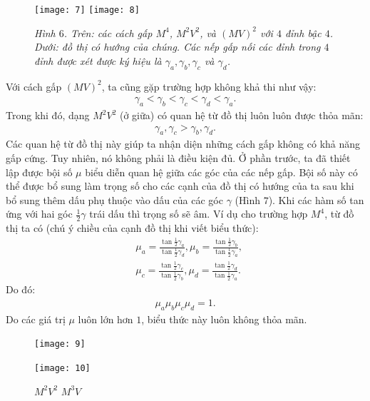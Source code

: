 \begin{multicols}{2}
\begin{figure}[H]
		\vspace*{-5pt}
		\centering
		\captionsetup{labelformat= empty, justification=centering}
		\texttt{[image: 7]}
		\texttt{[image: 8]}
		\caption{\small\textit{\color{duongvaotoanhoc}Hình $6$. Trên: các cách gấp $M^4$, $M^2 V^2$, và $(MV)^2$ với $4$ đỉnh bậc $4$. Dưới: đồ thị có hướng của chúng. Các nếp gấp nối các đỉnh trong $4$ đỉnh được xét được ký hiệu là $\gamma_a, \gamma_b, \gamma_c$ và $\gamma_d$.}}
		\vspace*{-5pt}
	\end{figure}
	Với cách gấp $(MV)^2$, ta cũng gặp trường hợp không khả thi như vậy:
	\begin{align*}
		\gamma_a<\gamma_b<\gamma_c<\gamma_d<\gamma_a.
	\end{align*}
	Trong khi đó, dạng $M^2 V^2$ (ở giữa) có quan hệ từ đồ thị luôn luôn được thỏa mãn:
	\begin{align*}
		\gamma_a,\gamma_c>\gamma_b,\gamma_d.
	\end{align*} 
	Các quan hệ từ đồ thị này giúp ta nhận diện những cách gấp không có khả năng gấp cứng. Tuy nhiên, nó không phải là điều kiện đủ. Ở phần trước, ta đã thiết lập được bội số $\mu$ biểu diễn quan hệ giữa các góc của các nếp gấp. Bội số này có thể được bổ sung làm trọng số cho các cạnh của đồ thị có hướng của ta sau khi bổ sung thêm dấu phụ thuộc vào dấu của các góc $\gamma$ (Hình $7$). Khi các hàm số tan ứng với hai góc $\frac{1}{2}\gamma$ trái dấu thì trọng số sẽ âm.
	\vskip 0.05cm
	Ví dụ cho trường hợp $M^4$, từ đồ thị ta có (chú ý chiều của cạnh đồ thị khi viết biểu thức):
	\begin{align*}
		&\mu_a = \frac{\tan\frac{1}{2}\gamma_a}{\tan\frac{1}{2}\gamma_d},\mu_b = \frac{\tan\frac{1}{2}\gamma_b}{\tan\frac{1}{2}\gamma_a},\\
		& \mu_c= \frac{\tan\frac{1}{2}\gamma_c}{\tan\frac{1}{2}\gamma_b}, \mu_d = \frac{\tan\frac{1}{2}\gamma_d}{\tan\frac{1}{2}\gamma_a}.
	\end{align*}
	Do đó:
	\begin{align*}
		\mu_a\mu_b\mu_c\mu_d = 1.
	\end{align*}
	Do các giá trị $\mu$ luôn lớn hơn $1$, biểu thức này luôn không thỏa mãn.
	\begin{figure}[H]
		\vspace*{-5pt}
		\centering
		\captionsetup{labelformat= empty, justification=centering}
		\texttt{[image: 9]}
		\caption{\quad$M^4$				\hspace*{75pt}		$(MV)^2$}
		\texttt{[image: 10]}
		\caption{$M^2 V^2$ \hspace*{65pt}					$M^3 V$}

\end{figure}
\end{multicols}
